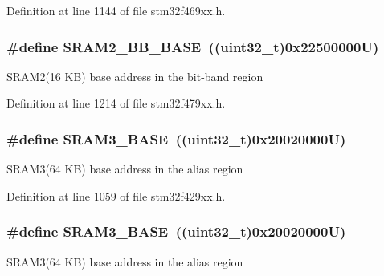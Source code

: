 Definition at line 1144 of file stm32f469xx.\+h.

\subsubsection[{\texorpdfstring{S\+R\+A\+M2\+\_\+\+B\+B\+\_\+\+B\+A\+SE}{SRAM2_BB_BASE}}]{\setlength{\rightskip}{0pt plus 5cm}\#define S\+R\+A\+M2\+\_\+\+B\+B\+\_\+\+B\+A\+SE~((uint32\+\_\+t)0x22500000\+U)}\hypertarget{group___peripheral__memory__map_gac33cb6edadf184ab9860d77089503922}{}\label{group___peripheral__memory__map_gac33cb6edadf184ab9860d77089503922}
S\+R\+A\+M2(16 K\+B) base address in the bit-\/band region 

Definition at line 1214 of file stm32f479xx.\+h.

\subsubsection[{\texorpdfstring{S\+R\+A\+M3\+\_\+\+B\+A\+SE}{SRAM3_BASE}}]{\setlength{\rightskip}{0pt plus 5cm}\#define S\+R\+A\+M3\+\_\+\+B\+A\+SE~((uint32\+\_\+t)0x20020000\+U)}\hypertarget{group___peripheral__memory__map_gadb41012a2428a526d7ee5ff0f61d2344}{}\label{group___peripheral__memory__map_gadb41012a2428a526d7ee5ff0f61d2344}
S\+R\+A\+M3(64 K\+B) base address in the alias region 

Definition at line 1059 of file stm32f429xx.\+h.

\subsubsection[{\texorpdfstring{S\+R\+A\+M3\+\_\+\+B\+A\+SE}{SRAM3_BASE}}]{\setlength{\rightskip}{0pt plus 5cm}\#define S\+R\+A\+M3\+\_\+\+B\+A\+SE~((uint32\+\_\+t)0x20020000\+U)}\hypertarget{group___peripheral__memory__map_gadb41012a2428a526d7ee5ff0f61d2344}{}\label{group___peripheral__memory__map_gadb41012a2428a526d7ee5ff0f61d2344}
S\+R\+A\+M3(64 K\+B) base address in the alias region 


